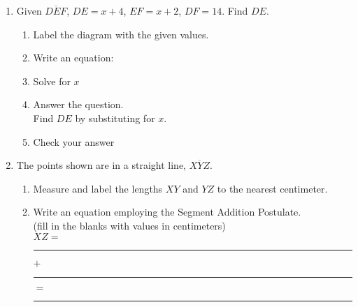 \begin{enumerate}
\item Given $\overline{DEF}$, $DE=x+4$, $EF=x+2$, $DF=14$. Find ${DE}$.
  \begin{enumerate}
  \item Label the diagram with the given values.
  \begin{flushright}
  \end{flushright} \vspace{0.5cm}
  \item Write an equation: \vspace{1cm}
  \item Solve for $x$
  \vspace{3cm}
  \item Answer the question. \\
  Find $DE$ by substituting for $x$. \vspace{1.5cm}
  \item Check your answer
  \end{enumerate}

\item The points shown are in a straight line, $\overline{XYZ}$. 
\begin{enumerate}
  \item Measure and label the lengths $XY$ and $YZ$ to the nearest centimeter.\\[1.5cm]
     \vspace{0.5cm}
  \item Write an equation employing the Segment Addition Postulate.\\ (fill in the blanks with values in centimeters)\\[1cm]
  $XZ=$ \rule{2cm}{0.15mm} $+$ \rule{2cm}{0.15mm} $=$ \rule{2cm}{0.15mm}
\end{enumerate} \vspace{0.5cm}


\end{enumerate}
